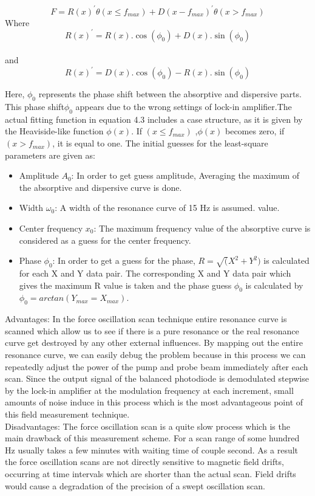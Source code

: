 \documentclass[12pt]{report}
\begin{document}
\begin{equation}
F = R(x)^{'}\theta(x \leq f_{max}) + D(x-f_{max})^{'}\theta(x > f_{max})
\end{equation}
Where 
\begin{equation}
R(x)^{'}=R(x) . \cos(\phi_0) + D(x) .\sin(\phi_0)
\end{equation}\\
and
\begin{equation}
R(x)^{'}=D(x) . \cos(\phi_0) - R(x) .\sin(\phi_0)
\end{equation}

Here, $\phi_{0} $ represents the phase shift between the absorptive and dispersive parts. This phase shift$\phi_{0}$ appears due to the wrong settings of lock-in amplifier.The actual fitting function in equation 4.3 includes a case
structure, as it is given by the Heaviside-like function $\phi(x)$. If $ (x \leq f_{max}) $ ,$\phi(x)$ becomes zero,
if $(x > f_{max})$, it is equal to one. The initial guesses for the least-square parameters are given
as:\\
\begin{itemize}
\item
Amplitude $A_0$: In order to get guess amplitude, Averaging the maximum of the absorptive and dispersive curve is done.
\item
Width $\omega_0$: A width of the resonance curve of 15 Hz is assumed.
value.
\item
Center frequency $x_0$: The maximum frequency value of the
absorptive curve is considered as a guess for the center frequency.
\item
Phase $\phi_0$: In order to get a guess for the phase, $ R =\sqrt (
X^2 + Y ^2)$ is calculated for each
X and Y data pair. The corresponding X and Y data pair which gives the maximum
R value is taken and the phase guess $\phi _0$  is calculated by $\phi _0 = arctan(Y_{max}=X_{max})$.
\end{itemize}
Advantages: In the force oscillation scan technique entire resonance curve is scanned which allow us to see if there is a pure resonance or the real resonance curve get destroyed by any other external influences. By mapping out the entire resonance curve, we can easily debug the problem because in this process we can repeatedly adjust the power of the pump and probe beam immediately after each scan. Since the output signal of the balanced photodiode is demodulated stepwise by the lock-in amplifier at the modulation frequency at each increment, small amounts of noise induce in this process which is the most advantageous point of this field measurement technique. \\
Disadvantages: The force oscillation scan is a quite slow process which is the main drawback of this measurement scheme.
For a scan range of some hundred Hz usually takes a few minutes with  waiting time of couple second. As a result the force oscillation scans are not directly sensitive to magnetic field drifts, occurring at time intervals which are shorter than the actual scan. Field drifts would cause a degradation of the precision of a swept oscillation scan.
\end{document}
